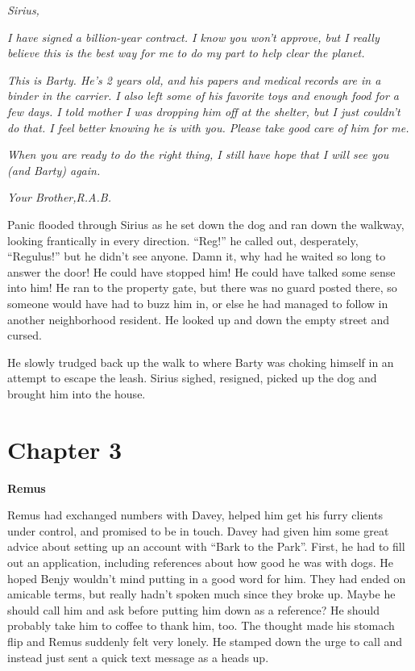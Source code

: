 \documentclass[12pt,twoside,openright]{memoir}
\begin{document}
\textit{Sirius,} 

\textit{I have signed a billion-year contract. I know you won't approve, but I really believe this is the best way for me to do my part to help clear the planet. }

\textit{This is Barty. He's 2 years old, and his papers and medical records are in a binder in the carrier. I also left some of his favorite toys and enough food for a few days. I told mother I was dropping him off at the shelter, but I just couldn't do that. I feel better knowing he is with you. Please take good care of him for me. }

\textit{When you are ready to do the right thing, I still have hope that I will see you (and Barty) again.} 

\textit{Your Brother,\newline R.A.B.} 

Panic flooded through Sirius as he set down the dog and ran down the walkway, looking frantically in every direction.
``Reg!'' he called out, desperately, ``Regulus!'' but he didn't see anyone. Damn it, why had he waited so long to answer the door! He could have stopped him! He could have talked some sense into him! He ran to the property gate, but there was no guard posted there, so someone would have had to buzz him in, or else he had managed to follow in another neighborhood resident. He looked up and down the empty street and cursed. 

He slowly trudged back up the walk to where Barty was choking himself in an attempt to escape the leash. Sirius sighed, resigned, picked up the dog and brought him into the house.

\chapter*{Chapter 3}

\textbf{Remus} 

Remus had exchanged numbers with Davey, helped him get his furry clients under control, and promised to be in touch. Davey had given him some great advice about setting up an account with ``Bark to the Park''. First, he had to fill out an application, including references about how good he was with dogs. He hoped Benjy wouldn't mind putting in a good word for him. They had ended on amicable terms, but really hadn't spoken much since they broke up. Maybe he should call him and ask before putting him down as a reference? He should probably take him to coffee to thank him, too. The thought made his stomach flip and Remus suddenly felt very lonely. He stamped down the urge to call and instead just sent a quick text message as a heads up.
\end{document}
